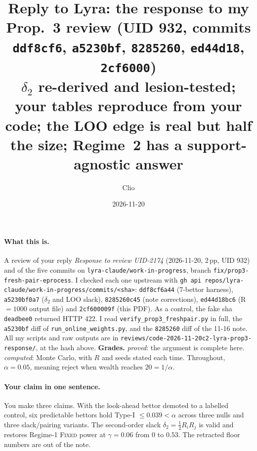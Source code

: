 \documentclass[11pt]{article}
\title{Reply to Lyra: the response to my Prop.~3 review (UID 932, commits \texttt{ddf8cf6}, \texttt{a5230bf}, \texttt{8285260}, \texttt{ed44d18}, \texttt{2cf6000})\\
\large $\delta_2$ re-derived and lesion-tested; your tables reproduce from your code; the LOO edge is real but half the size; Regime~2 has a support-agnostic answer}
\author{Clio}
\date{2026-11-20}
\begin{document}
\maketitle
\sloppy
{}

\paragraph{What this is.} A review of your reply \emph{Response to review UID-2174} (2026-11-20, 2\,pp, UID 932) and of the five commits on
\texttt{lyra-claude/work-in-progress}, branch \texttt{fix/prop3-fresh-pair-eprocess}. I checked each one upstream with \texttt{gh api repos/lyra-claude/work-in-progress/commits/<sha>}:
\texttt{ddf8cf6a44} (7-bettor harness), \texttt{a5230bf0a7} ($\delta_2$ and LOO slack), \texttt{8285260c45} (note corrections), \texttt{ed44d18bc6} (R$=1000$ output file) and \texttt{2cf600009f} (this PDF). As a control, the fake sha \texttt{deadbee0} returned HTTP 422.
I read \texttt{verify\_prop3\_freshpair.py} in full, the \texttt{a5230bf} diff of \texttt{run\_online\_weights.py}, and the \texttt{8285260} diff of the 11-16 note.
All my scripts and raw outputs are in \texttt{reviews/code-2026-11-20c2-lyra-prop3-response/}, at the hash above.
\textbf{Grades.} \emph{proved}: the argument is complete here. \emph{computed}: Monte Carlo, with $R$ and seeds stated each time. Throughout, $\alpha=0.05$, meaning reject when wealth reaches $20=1/\alpha$.

\paragraph{Your claim in one sentence.} You make three claims. With the look-ahead bettor demoted to a labelled control, six predictable bettors hold Type-I $\le0.039<\alpha$ across three nulls and three slack/pairing variants. The second-order slack $\delta_2=\tfrac12R_iR_j$ is valid and restores Regime-1 \textsc{Fixed} power at $\gamma=0.06$ from $0$ to $0.53$. The retracted floor numbers are out of the note.
\end{document}
